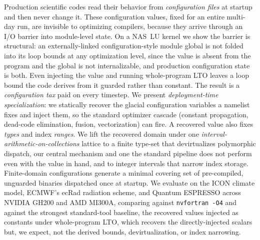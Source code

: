 Production scientific codes read their behavior from \emph{configuration files} at startup and then never change it. These configuration values, fixed for an entire multi-day run, are invisible to optimizing compilers, because they arrive through an I/O barrier into module-level state. On a NAS~LU kernel we show the barrier is structural: an externally-linked configuration-style module global is not folded into its loop bounds at any optimization level, since the value is absent from the program and the global is not internalizable, and production configuration state is both. Even injecting the value and running whole-program LTO leaves a loop bound the code derives from it guarded rather than constant. The result is a \emph{configuration tax} paid on every timestep. We present \emph{deployment-time specialization}: we statically recover the glacial configuration variables a namelist fixes and inject them, so the standard optimizer cascade (constant propagation, dead-code elimination, fusion, vectorization) can fire. A recovered value also fixes \emph{types} and index \emph{ranges}. We lift the recovered domain under one \emph{interval-arithmetic-on-collections} lattice to a finite type-set that devirtualizes polymorphic dispatch, our central mechanism and one the standard pipeline does not perform even with the value in hand, and to integer intervals that narrow index storage. Finite-domain configurations generate a minimal covering set of pre-compiled, unguarded binaries dispatched once at startup. We evaluate on the ICON climate model, ECMWF's ecRad radiation scheme, and Quantum ESPRESSO across NVIDIA GH200 and AMD MI300A, comparing against \texttt{nvfortran -O4} and against the strongest standard-tool baseline, the recovered values injected as constants under whole-program LTO, which recovers the directly-injected scalars but, we expect, not the derived bounds, devirtualization, or index narrowing.
